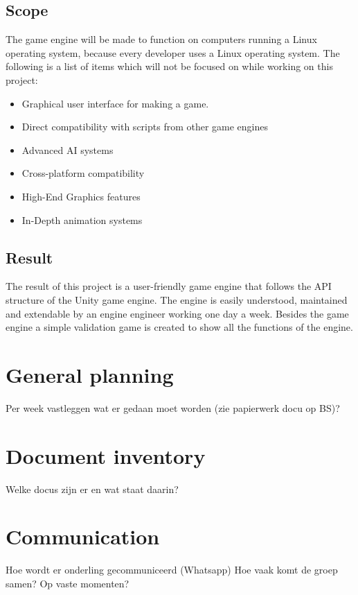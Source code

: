 \documentclass{article} %
\begin{document}
    \subsection{Scope}
    The game engine will be made to function on computers running a Linux operating system, because every developer uses a Linux operating system.
    \newline\newline
    The following is a list of items which will not be focused on while working on this project:  
    \begin{itemize}
        \item Graphical user interface for making a game.
        \item Direct compatibility with scripts from other game engines
        \item Advanced AI systems 
        \item Cross-platform compatibility
        \item High-End Graphics features
        \item In-Depth animation systems
    \end{itemize}

    \subsection{Result}
    The result of this project is a user-friendly game engine that follows the API structure of the Unity game engine. 
    The engine is easily understood, maintained and extendable by an engine engineer working one day a week.
    \newline\newline
    Besides the game engine a simple validation game is created to show all the functions of the engine.
    \newpage

    \section{General planning} %
    Per week vastleggen wat er gedaan moet worden (zie papierwerk docu op BS)? 
    \newpage

    \section{Document inventory}
    Welke docus zijn er en wat staat daarin?
    \newpage

    \section{Communication}
    Hoe wordt er onderling gecommuniceerd (Whatsapp)
    Hoe vaak komt de groep samen? Op vaste momenten?
    \newpage
\end{document}
